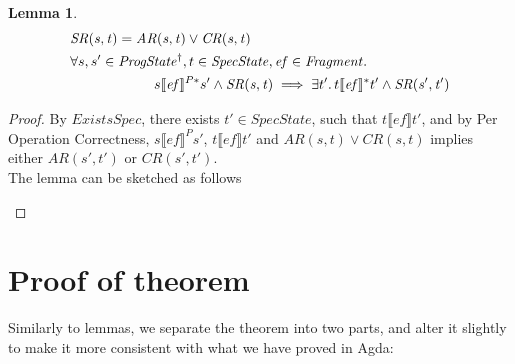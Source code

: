 \documentclass[letterpaper,twocolumn,10pt]{article}
\newtheorem{lemma}[theorem]{Lemma}
\theoremstyle{definition}
\begin{document}
\begin{lemma}\label{lemma-1}
	\begin{align*}
		&\mathit{SR(s, t)} = \mathit{AR(s, t)} \lor \mathit{CR(s, t)}\\
		&\forall s, s' \in \mathit{ProgState^\dagger}, t \in \mathit{SpecState}, \mathit{ef} \in \mathit{Fragment} \ldotp\\
		&\qquad \qquad \qquad s \llbracket \mathit{ef} \rrbracket^{P*} s'  \land \mathit{SR(s, t)} \implies \exists t' \ldotp t\llbracket \mathit{ef} \rrbracket^* t' \land \mathit{SR(s', t')} \\
	\end{align*}
\end{lemma}
\begin{proof}
	By $\mathit{ExistsSpec}$, there exists $t' \in SpecState$, such that $t \llbracket \mathit{ef} \rrbracket t'$, and by Per Operation Correctness, $s \llbracket \mathit{ef} \rrbracket^P s'$, $t \llbracket \mathit{ef} \rrbracket t'$ and $\mathit{AR(s, t)} \lor \mathit{CR(s, t)}$ implies either $\mathit{AR(s', t')}$ or $\mathit{CR(s', t')}$. \\
	The lemma can be sketched as follows
	\begin{figure} [h] \centering
{}
	\end{figure}
\end{proof}

\section{Proof of theorem}

Similarly to lemmas, we separate the theorem into two parts, and alter it slightly to make it more consistent with what we have proved in Agda:
\end{document}
